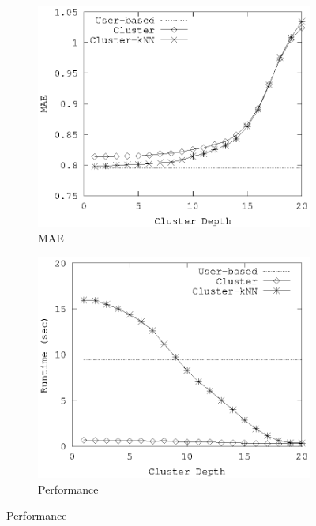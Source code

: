 \documentclass[conference]{IEEEtran}
\begin{document}
\begin{figure}[!h]
        \begin{subfigure}[b]{0.225\textwidth}
                \includegraphics[width=\textwidth]{charts/cl-mae.eps}
                \caption{MAE}
                \label{fig:cl-mae}
        \end{subfigure}
        \quad
        \begin{subfigure}[b]{0.225\textwidth}
                \includegraphics[width=\textwidth]{charts/cl-runtime.eps}
                \caption{Performance}
                \label{fig:cl-runtime}

\end{subfigure}
\end{figure}
\end{document}
